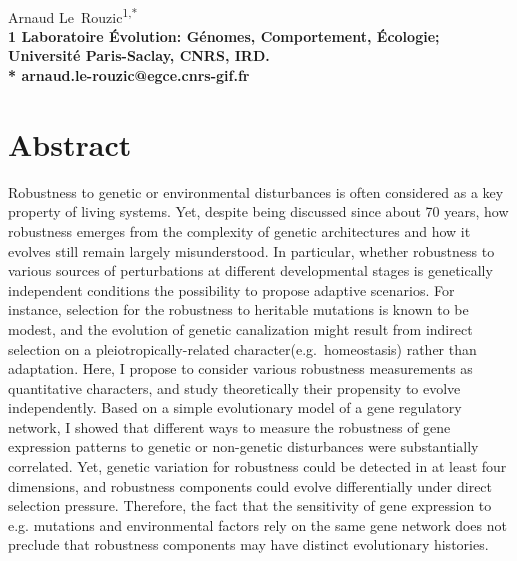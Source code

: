 \documentclass[10pt,a4paper]{article}
\title{}
\date{}
\begin{document}
\vspace*{0.35in}

\begin{flushleft}
{\Large
\textbf{}
}
\newline
\\
Arnaud Le~Rouzic\textsuperscript{1,*}
\\
\bigskip
\bf{1} Laboratoire Évolution: Génomes, Comportement, Écologie; Université Paris-Saclay, CNRS, IRD.
\\
\bigskip
* arnaud.le-rouzic@egce.cnrs-gif.fr

\end{flushleft}

\section*{Abstract}

Robustness to genetic or environmental disturbances is often considered as a key property of living systems. Yet, despite being discussed since about 70 years, how robustness emerges from the complexity of genetic architectures and how it evolves still remain largely misunderstood. In particular, whether robustness to various sources of perturbations at different developmental stages is genetically independent conditions the possibility to propose adaptive scenarios. For instance, selection for the robustness to heritable mutations is known to be modest, and the evolution of genetic canalization might result from indirect selection on a pleiotropically-related character(e.g.\ homeostasis) rather than adaptation. Here, I propose to consider various robustness measurements as quantitative characters, and study theoretically their propensity to evolve independently. Based on a simple evolutionary model of a gene regulatory network, I showed that different ways to measure the robustness of gene expression patterns to genetic or non-genetic disturbances were substantially correlated. Yet, genetic variation for robustness could be detected in at least four dimensions, and robustness components could evolve differentially under direct selection pressure. Therefore, the fact that the sensitivity of gene expression to e.g. mutations and environmental factors rely on the same gene network does not preclude that robustness components may have distinct evolutionary histories. 


\linenumbers
\end{document}

